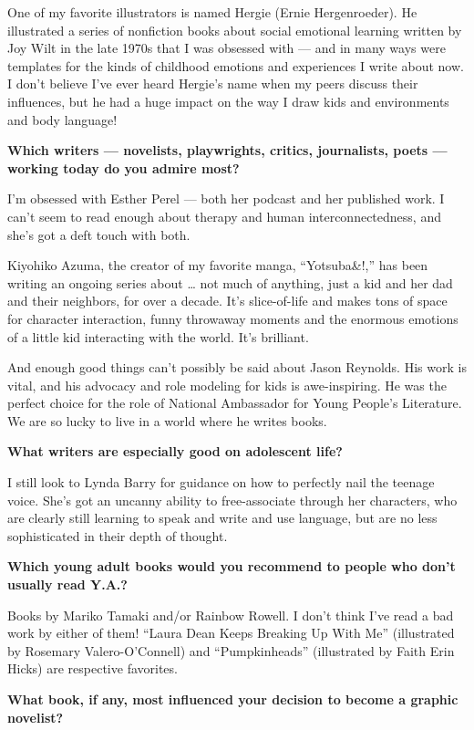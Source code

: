 One of my favorite illustrators is named Hergie (Ernie Hergenroeder). He
illustrated a series of nonfiction books about social emotional learning
written by Joy Wilt in the late 1970s that I was obsessed with --- and
in many ways were templates for the kinds of childhood emotions and
experiences I write about now. I don't believe I've ever heard Hergie's
name when my peers discuss their influences, but he had a huge impact on
the way I draw kids and environments and body language!

\textbf{Which writers --- novelists, playwrights, critics, journalists,
poets --- working today do you admire most?}

I'm obsessed with Esther Perel --- both her podcast and her published
work. I can't seem to read enough about therapy and human
interconnectedness, and she's got a deft touch with both.

Kiyohiko Azuma, the creator of my favorite manga, ``Yotsuba\&!,'' has
been writing an ongoing series about \ldots{} not much of anything, just
a kid and her dad and their neighbors, for over a decade. It's
slice-of-life and makes tons of space for character interaction, funny
throwaway moments and the enormous emotions of a little kid interacting
with the world. It's brilliant.

And enough good things can't possibly be said about Jason Reynolds. His
work is vital, and his advocacy and role modeling for kids is
awe-inspiring. He was the perfect choice for the role of National
Ambassador for Young People's Literature. We are so lucky to live in a
world where he writes books.

\textbf{What writers are especially good on adolescent life?}

I still look to Lynda Barry for guidance on how to perfectly nail the
teenage voice. She's got an uncanny ability to free-associate through
her characters, who are clearly still learning to speak and write and
use language, but are no less sophisticated in their depth of thought.

\textbf{Which young adult books would you recommend to people who don't
usually read Y.A.?}

Books by Mariko Tamaki and/or Rainbow Rowell. I don't think I've read a
bad work by either of them! ``Laura Dean Keeps Breaking Up With Me''
(illustrated by Rosemary Valero-O'Connell) and ``Pumpkinheads''
(illustrated by Faith Erin Hicks) are respective favorites.

\textbf{What book, if any, most influenced your decision to become a
graphic novelist?}

